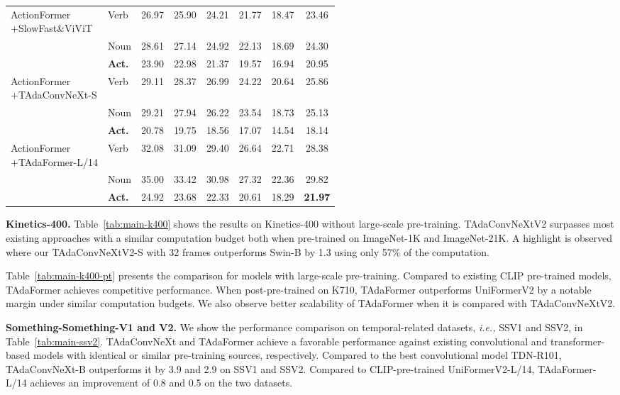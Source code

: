 \documentclass[10pt,journal,compsoc]{IEEEtran}
\newcommand\graycell[0]{\cellcolor{midgrey}}
\begin{document}
\begin{table}[t]
\begin{tabular}{llcccccc}
        \midrule
        \multirowcell{3}[0pt][l]{ActionFormer~\cite{actionformer-ek100-2022-challenge-report}\\+SlowFast\&ViViT} & Verb & 26.97 & 25.90 & 24.21 & 21.77 & 18.47 & 23.46\\
        ~ & Noun & 28.61 & 27.14 & 24.92 & 22.13 & 18.69 & 24.30 \\ 
        ~ & \bf Act. & 23.90 & 22.98 & 21.37 & 19.57 & 16.94 & 20.95 \\
        \midrule
        \multirowcell{3}[0pt][l]{ActionFormer\\+TAdaConvNeXt-S} & Verb & 29.11 & 28.37 & 26.99 & 24.22 & 20.64 & 25.86 \\
        ~ & Noun & 29.21 & 27.94 & 26.22 & 23.54 & 18.73 & 25.13 \\
        ~ & \graycell\bf Act. & \graycell20.78 & \graycell19.75 & \graycell18.56 & \graycell17.07 & \graycell14.54 & \graycell18.14 \\
        \midrule
        \multirowcell{3}[0pt][l]{ActionFormer\\+TAdaFormer-L/14} & Verb & 32.08 & 31.09 & 29.40 & 26.64 & 22.71 & 28.38\\
        ~ & Noun & 35.00 & 33.42 & 30.98 & 27.32 & 22.36 & 29.82 \\
        ~ & \graycell\bf Act. & \graycell24.92 & \graycell23.68 & \graycell22.33& \graycell20.61 & \graycell18.29 & \graycell\bf21.97 \\
        \bottomrule
    \end{tabular}
    \label{tab:ek100-localization}
\end{table}
\textbf{Kinetics-400. }Table~\ref{tab:main-k400} shows the results on Kinetics-400 without large-scale pre-training. TAdaConvNeXtV2 surpasses most existing approaches with a similar computation budget both when pre-trained on ImageNet-1K and ImageNet-21K. A highlight is observed where our TAdaConvNeXtV2-S with 32 frames outperforms Swin-B by 1.3 using only 57\% of the computation. 

Table~\ref{tab:main-k400-pt} presents the comparison for models with large-scale pre-training. Compared to existing CLIP pre-trained models, TAdaFormer achieves competitive performance. When post-pre-trained on K710, TAdaFormer outperforms UniFormerV2 by a notable margin under similar computation budgets. We also observe better scalability of TAdaFormer when it is compared with TAdaConvNeXtV2. 

\textbf{Something-Something-V1 and V2. }We show the performance comparison on temporal-related datasets, \textit{i.e.,} SSV1 and SSV2, in Table~\ref{tab:main-ssv2}. TAdaConvNeXt and TAdaFormer achieve a favorable performance against existing convolutional and transformer-based models with identical or similar pre-training sources, respectively. Compared to the best convolutional model TDN-R101, TAdaConvNeXt-B outperforms it by 3.9 and 2.9 on SSV1 and SSV2. Compared to CLIP-pre-trained UniFormerV2-L/14, TAdaFormer-L/14 achieves an improvement of 0.8 and 0.5 on the two datasets. 
\end{document}
